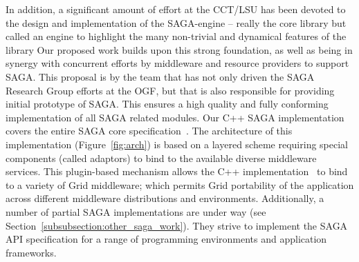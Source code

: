 \documentclass[10pt,letterpaper]{article}
\begin{document}
 In addition, a significant amount of effort at the
CCT/LSU has been devoted to the design and implementation of the
SAGA-engine -- really the core library but called an engine to
highlight the many non-trivial and dynamical features of the library
Our proposed work builds upon this strong foundation, as well as being
in synergy with concurrent efforts by middleware and resource
providers to support SAGA.  This proposal is by the team that has not
only driven the SAGA Research Group efforts at the OGF, but that is
also responsible for providing initial prototype of SAGA.  This
ensures a high quality and fully conforming implementation of all SAGA
related modules.  Our C++ SAGA implementation covers the entire SAGA
core specification~\cite{saga-core}. The architecture of this
implementation (Figure~\ref{fig:arch}) is based on a layered scheme
requiring special components (called adaptors) to bind to the
available diverse middleware services. This plugin-based mechanism
allows the C++ implementation~\cite{saga-c++-engine} to bind to a
variety of Grid middleware; which permits Grid portability of the
application across different middleware distributions and
environments.  Additionally, a number of partial SAGA implementations
are under way (see Section~\ref{subsubsection:other_saga_work}).  They
strive to implement the SAGA API specification for a range of
programming environments and application frameworks.



\end{document}

